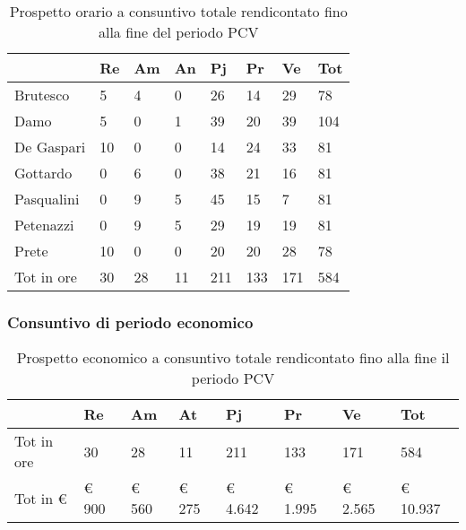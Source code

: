 		\begin{table}[h] \begin{center} \begin{tabular}{llllllll}																					
					\toprule																					
					&	Re		&	Am		&	An		&	Pj		&	Pr		&	Ve		&	Tot	\\
					\midrule																					
					Brutesco	&	5		&	4		&	0		&	26		&	14		&	29		&	78	\\
					Damo		&	5		&	0		&	1		&	39		&	20		&	39		&	104	\\
					De Gaspari	&	10		&	0		&	0		&	14		&	24		&	33		&	81	\\
					Gottardo	&	0		&	6		&	0		&	38		&	21		&	16		&	81	\\
					Pasqualini	&	0		&	9		&	5		&	45		&	15		&	7		&	81	\\
					Petenazzi	&	0		&	9		&	5		&	29		&	19		&	19		&	81	\\
					Prete		&	10		&	0		&	0		&	20		&	20		&	28		&	78	\\
					\midrule																					
					Tot in ore	&	30		&	28		&	11		&	211		&	133		&	171		&	584	\\
					\bottomrule																					
				\end{tabular} \end{center} \caption{Prospetto orario a consuntivo totale rendicontato fino alla fine del periodo PCV															
			} \end{table}
			\subsubsection{Consuntivo di periodo economico}
			\begin{table}[H] \begin{center} \begin{tabular}{llllllll}
						\toprule
						&	\textbf{Re}	&	\textbf{Am}	&	\textbf{At}	&	\textbf{Pj}	&	\textbf{Pr}	&	\textbf{Ve}	&	\textbf{Tot}\\
						\midrule																					
						Tot in ore	&	30		&	28		&	11		&	211		&	133		&	171		&	584	\\
						Tot in €	&	 € 900 		 & 	 € 560 		 & 	 € 275 		 & 	 € 4.642 		 & 	 € 1.995 		 & 	 € 2.565 		 & 	 € 10.937 	\\
						\bottomrule			
					\end{tabular} \end{center} \caption{Prospetto economico a consuntivo totale rendicontato fino alla fine il periodo PCV	
				}\label{tab:s_TotaleNonRendicontato} \end{table}

